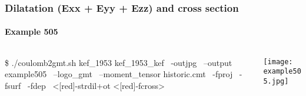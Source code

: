 \begin{frame}[t,fragile]
  \frametitle{Dilatation (Exx + Eyy + Ezz) and cross section}
  \framesubtitle{Example 505}
  \label{ch5fr:ex505}
\begin{columns}[t]
  \begin{column}{.5\textwidth}
\begin{scriptsize}
\begin{verbnobox}[\vbdelim]
\$ ./coulomb2gmt.sh kef_1953 kef_1953_kef \
                   -outjpg \ 
                   --output example505 \
                   --logo_gmt \
                   --moment_tensor historic.cmt \
                   -fproj \
                   -fsurf \
                   -fdep \
                   <[red]-strdil+ot \>
                   <[red]-fcross>
\end{verbnobox}
\end{scriptsize}

  \end{column}
  \begin{column}{.5\textwidth}

\centering
  \texttt{[image: example505.jpg]}
  \end{column}
\end{columns}

\end{frame}
\note{}




















